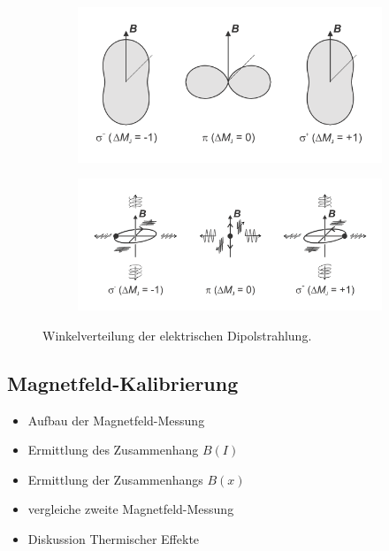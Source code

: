     \begin{figure}[H]
        \centering
        \begin{subfigure}[t]{0.44\textwidth}
            \includegraphics[width=\linewidth]{figs/Zeeman_B-Feld.png}
            \caption{}
        \end{subfigure}
        \hspace{0.2cm}
        \begin{subfigure}[t]{0.44\textwidth}
            \includegraphics[width=\linewidth]{figs/Zeeman_Dipolstrahlung.png}
            \caption{}
        \end{subfigure}
        \caption{Winkelverteilung der elektrischen Dipolstrahlung. \cite{Zeemann-Effekt_LD-Handblätter}}
    \end{figure}



\subsection{Magnetfeld-Kalibrierung}
    \begin{itemize}
        \item Aufbau der Magnetfeld-Messung
        \item Ermittlung des Zusammenhang $B(I)$
        \item Ermittlung der Zusammenhangs $B(x)$
        \item vergleiche zweite Magnetfeld-Messung
        \item Diskussion Thermischer Effekte
    \end{itemize}


